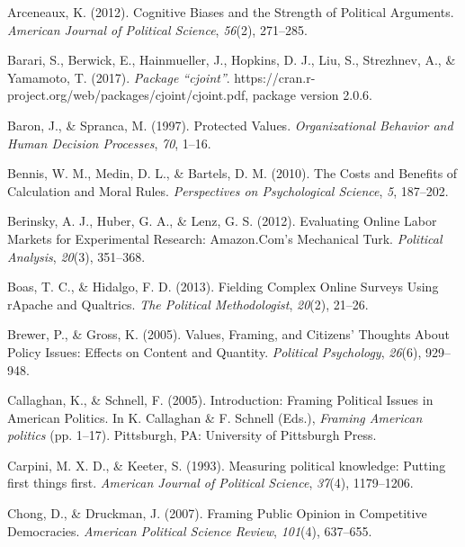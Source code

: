 \documentclass[12pt,econ]{sources/authesis}
\begin{document}
\leavevmode\hypertarget{ref-arceneaux_cognitive_2012}{}%
Arceneaux, K. (2012). Cognitive Biases and the Strength of Political Arguments. \emph{American Journal of Political Science}, \emph{56}(2), 271--285.

\leavevmode\hypertarget{ref-barari_2017_package}{}%
Barari, S., Berwick, E., Hainmueller, J., Hopkins, D. J., Liu, S., Strezhnev, A., \& Yamamoto, T. (2017). \emph{Package ``cjoint''}. https://cran.r-project.org/web/packages/cjoint/cjoint.pdf, package version 2.0.6.

\leavevmode\hypertarget{ref-baron_protected_1997}{}%
Baron, J., \& Spranca, M. (1997). Protected Values. \emph{Organizational Behavior and Human Decision Processes}, \emph{70}, 1--16.

\leavevmode\hypertarget{ref-bennis_costs_2010}{}%
Bennis, W. M., Medin, D. L., \& Bartels, D. M. (2010). The Costs and Benefits of Calculation and Moral Rules. \emph{Perspectives on Psychological Science}, \emph{5}, 187--202.

\leavevmode\hypertarget{ref-berinsky_evaluating_2012}{}%
Berinsky, A. J., Huber, G. A., \& Lenz, G. S. (2012). Evaluating Online Labor Markets for Experimental Research: Amazon.Com's Mechanical Turk. \emph{Political Analysis}, \emph{20}(3), 351--368.

\leavevmode\hypertarget{ref-boas_fielding_2013}{}%
Boas, T. C., \& Hidalgo, F. D. (2013). Fielding Complex Online Surveys Using rApache and Qualtrics. \emph{The Political Methodologist}, \emph{20}(2), 21--26.

\leavevmode\hypertarget{ref-brewer_values_2005}{}%
Brewer, P., \& Gross, K. (2005). Values, Framing, and Citizens' Thoughts About Policy Issues: Effects on Content and Quantity. \emph{Political Psychology}, \emph{26}(6), 929--948.

\leavevmode\hypertarget{ref-callaghan_introduction_2005}{}%
Callaghan, K., \& Schnell, F. (2005). Introduction: Framing Political Issues in American Politics. In K. Callaghan \& F. Schnell (Eds.), \emph{Framing American politics} (pp. 1--17). Pittsburgh, PA: University of Pittsburgh Press.

\leavevmode\hypertarget{ref-carpini_1993_measuring}{}%
Carpini, M. X. D., \& Keeter, S. (1993). Measuring political knowledge: Putting first things first. \emph{American Journal of Political Science}, \emph{37}(4), 1179--1206.

\leavevmode\hypertarget{ref-chong_framing_2007}{}%
Chong, D., \& Druckman, J. (2007). Framing Public Opinion in Competitive Democracies. \emph{American Political Science Review}, \emph{101}(4), 637--655.
\end{document}

